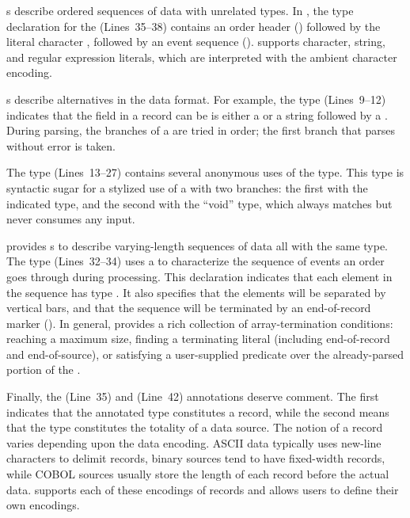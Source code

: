 
s describe ordered sequences of data with unrelated types.
In , the type declaration for the 
 (Lines~35--38)
contains an order header
() followed by the literal character ,
followed by an event sequence ().  \pads{} supports
character, string, and regular expression literals, which are
interpreted with the ambient character encoding.

s describe alternatives in the data format.  For example,
the  type (Lines~9--12) indicates
that the  field in a \dibbler{} record can be is either a
 or a string  followed by a .
During parsing, the branches of a  are tried in order; the
first branch that parses without error is taken.  

The  type (Lines~13--27) contains several anonymous uses of the
 type.  This type is syntactic sugar for a stylized use of a
 with two branches: the first with the indicated type, and
the second with the ``void'' type, which always matches but never
consumes any input.

\pads{} provides s to describe varying-length sequences of
data all with the same type.  The  type (Lines~32--34) uses a
 to characterize the sequence of events an order goes
through during processing.  This declaration indicates that each
element in the sequence has type .  It also specifies
that the elements will be separated by vertical bars, and that the
sequence will be terminated by an end-of-record marker ().
In general, \pads{} provides a rich collection of array-termination
conditions: reaching a maximum size, finding a terminating literal
(including end-of-record and end-of-source), or satisfying a
user-supplied predicate over the already-parsed portion of the
.

Finally, the  (Line~35) and  (Line~42) annotations deserve comment.  The first
indicates that the annotated type constitutes a record,
while the second means that the type constitutes the totality of a data source.  
The notion of a record varies depending upon the data encoding.  
ASCII data typically uses new-line characters to delimit 
records, binary sources tend to have fixed-width records, while 
COBOL sources usually store the length of each record before the actual data.
\pads{} supports each of these encodings of records and allows users to define
their own encodings.  

